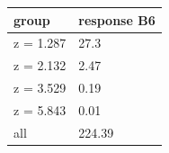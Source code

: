 \begingroup\small
\setlength{\tabcolsep}{3pt}
\renewcommand{\arraystretch}{1.04}
\begin{tabularx}{\linewidth}{XX}
\toprule
group & response B6 \\
\midrule
z = 1.287 & 27.3 \\
z = 2.132 & 2.47 \\
z = 3.529 & 0.19 \\
z = 5.843 & 0.01 \\
all & 224.39 \\
\bottomrule
\end{tabularx}
\endgroup
